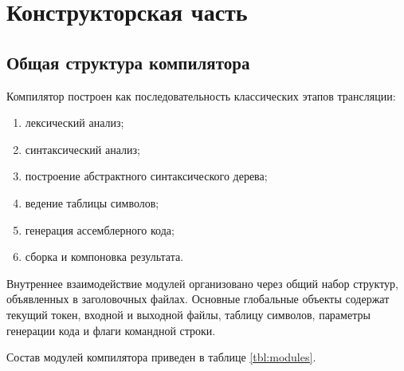 \chapter{Конструкторская часть}

\section{Общая структура компилятора}

Компилятор построен как последовательность классических этапов трансляции:

\begin{enumerate}
  \item лексический анализ;
  \item синтаксический анализ;
  \item построение абстрактного синтаксического дерева;
  \item ведение таблицы символов;
  \item генерация ассемблерного кода;
  \item сборка и компоновка результата.
\end{enumerate}

Внутреннее взаимодействие модулей организовано через общий набор структур, объявленных в заголовочных файлах. Основные глобальные объекты содержат текущий токен, входной и выходной файлы, таблицу символов, параметры генерации кода и флаги командной строки.

Состав модулей компилятора приведен в таблице \ref{tbl:modules}.

